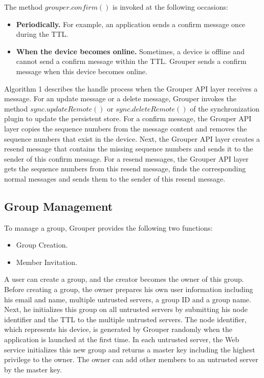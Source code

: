 The method $grouper.confirm()$ is invoked at the following occasions:

\begin{itemize}
	\setlength{\itemsep}{1pt}
	\setlength{\parskip}{0pt}
	\setlength{\parsep}{0pt}
	\item \textbf{Periodically.}
	For example, an application sends a confirm message once during the TTL.
	\item \textbf{When the device becomes online.} 
	Sometimes, a device is offline and cannot send a confirm message within the TTL.
	Grouper sends a confirm message when this device becomes online.
\end{itemize}

Algorithm 1 describes the handle process when the Grouper API layer receives a message.
For an update message or a delete message, Grouper invokes the method $sync.updateRemote()$ or $sync.deleteRemote()$ of the synchronization plugin to update the persistent store.
For a confirm message, the Grouper API layer copies the sequence numbers from the message content and removes the sequence numbers that exist in the device.
Next, the Grouper API layer creates a resend message that contains the missing sequence numbers and sends it to the sender of this confirm message.
For a resend messages, the Grouper API layer gets the sequence numbers from this resend message, finds the corresponding normal messages and sends them to the sender of this resend message.

\subsection{Group Management}

To manage a group, Grouper provides the following two functions:

\begin{itemize}
	\setlength{\itemsep}{1pt}
	\setlength{\parskip}{0pt}
	\setlength{\parsep}{0pt}
	\item Group Creation.
	\item Member Invitation.
\end{itemize}

A user can create a group, and the creator becomes the owner of this group.  
Before creating a group, the owner prepares his own user information including his email and name, multiple untrusted servers, a group ID and a group name. 
Next, he initializes this group on all untrusted servers by submitting his node identifier and the TTL to the multiple untrusted servers. 
The node identifier, which represents his device, is generated by Grouper randomly when the application is launched at the first time. 
In each untrusted server, the Web service initializes this new group and returns a master key including the highest privilege to the owner. 
The owner can add other members to an untrusted server by the master key.

